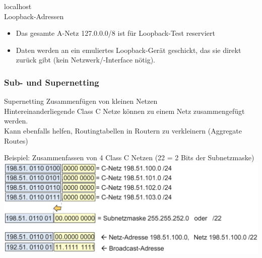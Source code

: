 \begin{definition}{localhost}\\
    Loopback-Adressen
    \begin{itemize}
        \item Das gesamte A-Netz 127.0.0.0/8 ist für Loopback-Test reserviert
        \item Daten werden an ein emuliertes Loopback-Gerät geschickt, das sie direkt zurück gibt (kein Netzwerk/-Interface nötig).
    \end{itemize}
\end{definition}

\subsubsection*{Sub- und Supernetting}

\begin{concept}{Supernetting}
    Zusammenfügen von kleinen Netzen\\
    Hintereinanderliegende Class C Netze können zu einem Netz zusammengefügt werden. \\
    Kann ebenfalls helfen, Routingtabellen in Routern zu verkleinern (Aggregate Routes)
\end{concept}

\begin{example}
    Beispiel: Zusammenfassen von 4 Class C Netzen (22 = 2 Bits der Subnetzmaske)\\
        \includegraphics[width=1\linewidth]{images/example_supernetting.png}
\end{example}

